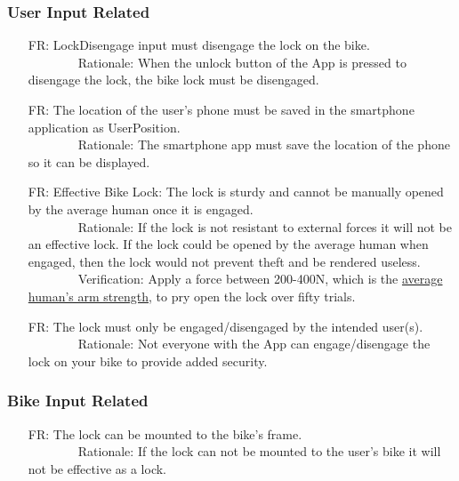 \documentclass[12pt]{article}
\newcounter{reqnum} %
\begin{document}
\subsubsection{User Input Related}
\begin{itemize}
\setlength{\itemindent}{.5in}
\item[FR\refstepcounter{reqnum}\thereqnum\label{FRDisengage}:] LockDisengage input must disengage the lock on the bike.
\\ \-\ \-\ \-\ \-\ \-\ \-\ \-\ \-\ Rationale: When the unlock button of the App is pressed to disengage the lock, the bike lock must be disengaged.
\item[FR\refstepcounter{reqnum}\thereqnum\label{FRUserPos}:] The location of the user’s phone must be saved in the smartphone application as UserPosition.
\\ \-\ \-\ \-\ \-\ \-\ \-\ \-\ \-\ Rationale: The smartphone app must save the location of the phone so it can be displayed.
\item[FR\refstepcounter{reqnum}\thereqnum\label{FRSturdy}:] Effective Bike Lock: The lock is sturdy and cannot be manually opened by the average human once it is engaged.
\\ \-\ \-\ \-\ \-\ \-\ \-\ \-\ \-\ Rationale: If the lock is not resistant to external forces it will not be an effective lock. If the lock could be opened by the average human when engaged, then the lock would not prevent theft and be rendered useless.
\\ \-\ \-\ \-\ \-\ \-\ \-\ \-\ \-\ Verification: Apply a force between 200-400N, which is the \href{https://www.tandfonline.com/doi/pdf/10.1080/10803548.2004.11076594?cookieSet=1}{average human's arm strength}, to pry open the lock over fifty trials. 
\item[FR\refstepcounter{reqnum}\thereqnum\label{FRCorrectUser}:] The lock must only be engaged/disengaged by the intended user(s).
\\ \-\ \-\ \-\ \-\ \-\ \-\ \-\ \-\ Rationale: Not everyone with the App can engage/disengage the lock on your bike to provide added security.
\end{itemize}

\subsubsection{Bike Input Related}
\begin{itemize}
\setlength{\itemindent}{.5in}
\item[FR\refstepcounter{reqnum}\thereqnum\label{FRBikeFrame}:] The lock can be mounted to the bike's frame.
\\ \-\ \-\ \-\ \-\ \-\ \-\ \-\ \-\ Rationale: If the lock can not be mounted to the user's bike it will not be effective as a lock.
\end{itemize}
\end{document}
